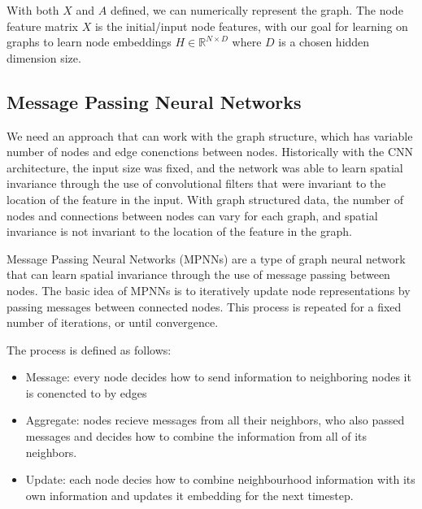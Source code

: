 \documentclass[../main.tex]{subfiles}
\begin{document}
  \begin{center}
    \end{center}

    With both $X$ and $A$ defined, we can numerically represent the graph. The node feature matrix $X$ is the initial/input node features, with our goal for learning on graphs to learn node embeddings $H \in \mathbb{R}^{N\times D}$ where $D$ is a chosen hidden dimension size. 


    \subsection{Message Passing Neural Networks}

    We need an approach that can work with the graph structure, which has variable number of nodes and edge conenctions between nodes. Historically with the CNN architecture, the input size was fixed, and the network was able to learn spatial invariance through the use of convolutional filters that were invariant to the location of the feature in the input. With graph structured data, the number of nodes and connections between nodes can vary for each graph, and spatial invariance is not invariant to the location of the feature in the graph. 

    Message Passing Neural Networks (MPNNs) are a type of graph neural network that can learn spatial invariance through the use of message passing between nodes. The basic idea of MPNNs is to iteratively update node representations by passing messages between connected nodes. This process is repeated for a fixed number of iterations, or until convergence.

    The process is defined as follows:
    \begin{itemize}
        \item Message: every node decides how to send information to neighboring nodes it is conencted to by edges
        \item Aggregate: nodes recieve messages from all their neighbors, who also passed messages and decides how to combine the information from all of its neighbors. 
        \item Update: each node decies how to combine neighbourhood information with its own information and updates it embedding for the next timestep. 
    \end{itemize}
\end{document}
